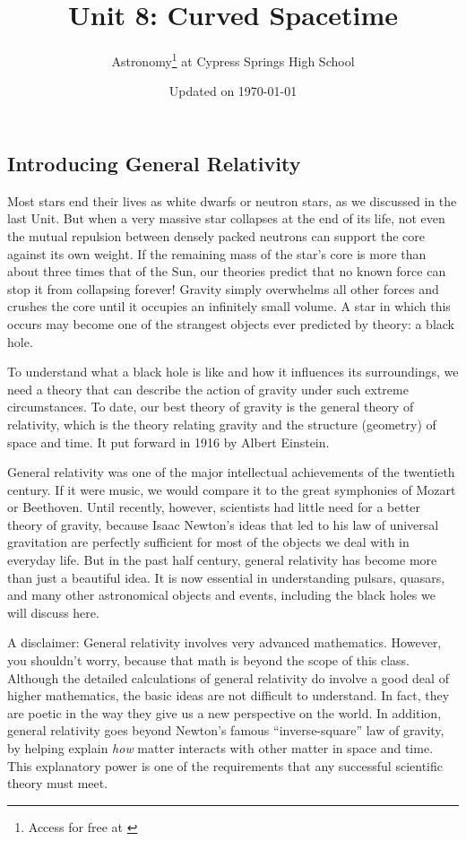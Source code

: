 \documentclass{article}
\title{Unit 8: Curved Spacetime}
\author{Astronomy\footnote{Access for free at \href{\openstax}{\openstax}} \hspace{0.1ex} at Cypress Springs High School}
\date{Updated on \today}
\numberwithin{equation}{section}
\numberwithin{figure}{section}
\begin{document}
\maketitle

\subsection{Introducing General Relativity} \label{QpSKf3}

Most stars end their lives as white dwarfs or neutron stars, as we discussed in the last Unit. But when a very massive star collapses at the end of its life, not even the mutual repulsion between densely packed neutrons can support the core against its own weight. If the remaining mass of the star's core is more than about three times that of the Sun, our theories predict that no known force can stop it from collapsing forever! Gravity simply overwhelms all other forces and crushes the core until it occupies an infinitely small volume. A star in which this occurs may become one of the strangest objects ever predicted by theory: a black hole.
\vspace{1em}

To understand what a black hole is like and how it influences its surroundings, we need a theory that can describe the action of gravity under such extreme circumstances. To date, our best theory of gravity is the \gls{general theory of relativity}, which is the theory relating gravity and the structure (geometry) of space and time. It put forward in 1916 by Albert Einstein.
\vspace{1em}

General relativity was one of the major intellectual achievements of the twentieth century. If it were music, we would compare it to the great symphonies of Mozart or Beethoven. Until recently, however, scientists had little need for a better theory of gravity, because Isaac Newton's ideas that led to his law of universal gravitation are perfectly sufficient for most of the objects we deal with in everyday life. But in the past half century, general relativity has become more than just a beautiful idea. It is now essential in understanding pulsars, quasars, and many other astronomical objects and events, including the black holes we will discuss here.
\vspace{1em}

A disclaimer: General relativity involves very advanced mathematics. However, you shouldn't worry, because that math is beyond the scope of this class. Although the detailed calculations of general relativity do involve a good deal of higher mathematics, the basic ideas are not difficult to understand. In fact, they are poetic in the way they give us a new perspective on the world. In addition, general relativity goes beyond Newton's famous ``inverse-square'' law of gravity, by helping explain \textit{how} matter interacts with other matter in space and time. This explanatory power is one of the requirements that any successful scientific theory must meet.
\end{document}
